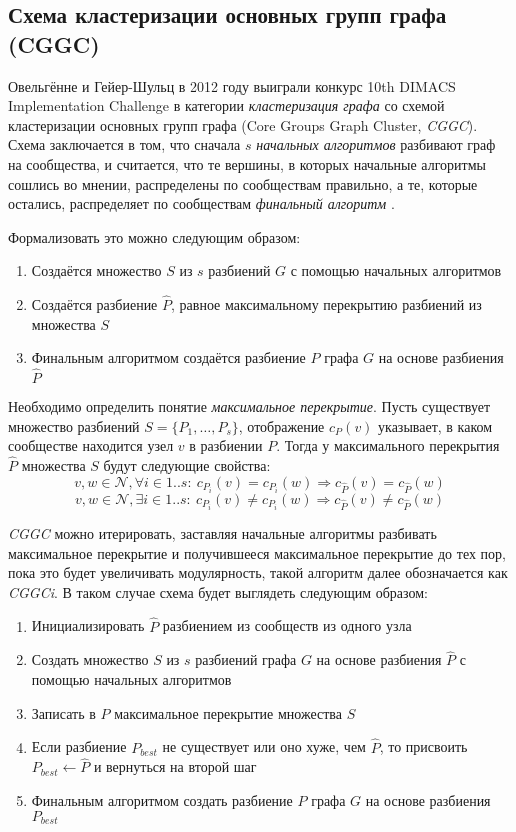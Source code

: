 
\subsection{Схема кластеризации основных групп графа (CGGC)}
\label{subsec:ens}

Овельгённе и Гейер-Шульц в 2012 году выиграли конкурс 10th DIMACS Implemen\-tation Challenge в категории \emph{кластеризация графа} со схемой кластеризации основных групп графа (Core Groups Graph Cluster, \emph{CGGC}). Схема заключается в том, что сначала $s$ \emph{начальных алгоритмов} разбивают граф на сообщества, и считается, что те вершины, в которых начальные алгоритмы сошлись во мнении, распределены по сообществам правильно, а те, которые остались, распределяет по сообществам \emph{финальный алгоритм} \cite{Ovelgoenne&Geyer-Schulz:2012b}.

Формализовать это можно следующим образом:
\begin{enumerate}
	\item Создаётся множество $S$ из $s$ разбиений $G$ с помощью начальных алгоритмов
	\item Создаётся разбиение $\hat{P}$, равное максимальному перекрытию разбиений из множества $S$
	\item Финальным алгоритмом создаётся разбиение $P$ графа $G$ на основе разбиения $\hat{P}$
\end{enumerate}

Необходимо определить понятие \emph{максимальное перекрытие}. Пусть существует множество разбиений $S = \{P_1, \dots, P_s\}$, отображение $c_P(v)$ указывает, в каком сообществе находится узел $v$ в разбиении $P$.
Тогда у максимального перекрытия $\hat{P}$ множества $S$ будут следующие свойства:
$$v, w \in \mathscr{N}, \forall i \in 1..s :\ c_{P_i}(v) = c_{P_i}(w) \Rightarrow c_{\hat{P}}(v) = c_{\hat{P}}(w)$$
$$v, w \in \mathscr{N}, \exists i \in 1..s :\ c_{P_i}(v) \ne c_{P_i}(w) \Rightarrow c_{\hat{P}}(v) \ne c_{\hat{P}}(w)$$

\emph{CGGC} можно итерировать, заставляя начальные алгоритмы разбивать максимальное перекрытие и получившееся максимальное перекрытие до тех пор, пока это будет увеличивать модулярность, такой алгоритм далее обозначается как \emph{CGGCi}. В таком случае схема будет выглядеть следующим образом:

\begin{enumerate}
	\item Инициализировать $\hat{P}$ разбиением из сообществ из одного узла
	\item Создать множество $S$ из $s$ разбиений графа $G$ на основе разбиения $\hat{P}$ с помощью начальных алгоритмов
	\item Записать в $\hat{P}$ максимальное перекрытие множества $S$
	\item Если разбиение $P_{best}$ не существует или оно хуже, чем $\hat{P}$, то присвоить $P_{best} \leftarrow \hat{P}$ и вернуться на второй шаг
	\item Финальным алгоритмом создать разбиение $P$ графа $G$ на основе разбиения $P_{best}$ 
\end{enumerate}

